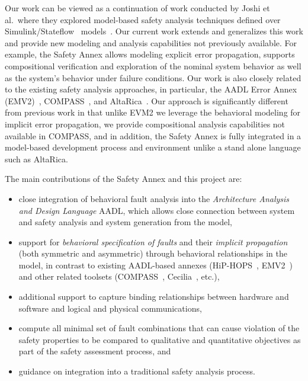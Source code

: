 Our work can be viewed as a continuation of work conducted by Joshi et al.~where they explored model-based safety analysis techniques defined over Simulink/Stateflow~\cite{MathWorks} models~\cite{Joshi05:SafeComp,Joshi07:Hase,Joshi05:Dasc,DBLP:conf/cav/BozzanoCPJKPRT15}. Our current work extends and generalizes this work and provide new modeling and analysis capabilities not previously available.  For example, the Safety Annex allows modeling explicit %
error propagation, supports compositional verification and exploration of the nominal system behavior as well as the system's behavior under failure conditions. Our work is also closely related to the existing safety analysis approaches, in particular, the AADL Error Annex (EMV2)~\cite{EMV2}, COMPASS~\cite{10.1007/978-3-642-04468-7_15}, and AltaRica~\cite{PROSVIRNOVA2013127,BieberERTS2018}. Our approach is significantly different from previous work in that unlike EVM2 we leverage the behavioral modeling for implicit %
error propagation, we provide compositional analysis capabilities not available in COMPASS, and in addition, the Safety Annex  is fully integrated in a model-based development process and environment unlike a stand alone language such as AltaRica. 

The main contributions of the Safety Annex and this project are:
\begin{itemize}
\renewcommand{\labelitemi}{\textbullet}
		\item close integration of behavioral fault analysis into the {\em Architecture Analysis and Design Language} AADL, which allows close connection between system and safety analysis and system generation from the model,
		\item support for {\em behavioral specification of faults} and their {\em implicit propagation} (both symmetric and asymmetric) through behavioral relationships in the model, in contrast to existing AADL-based annexes (HiP-HOPS~\cite{CHEN201391}, EMV2~\cite{EMV2}) and other related toolsets (COMPASS~\cite{10.1007/978-3-642-04468-7_15}, Cecilia~\cite{bieber2004safety}, etc.),
		\item additional support to capture binding relationships between hardware and software and logical and physical communications, %
		\item compute all minimal set of fault combinations that can cause violation of the safety properties to be compared to qualitative and quantitative objectives as part of the safety assessment process, and
		\item guidance on integration into a traditional safety analysis process.
\end{itemize}